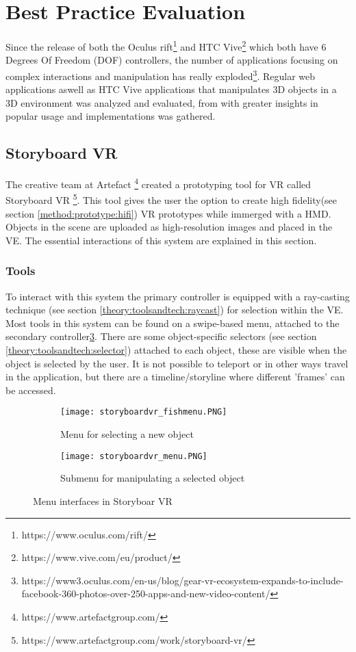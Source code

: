 \section{Best Practice Evaluation}
\label{theory:best-practice}
Since the release of both the Oculus rift\footnote{https://www.oculus.com/rift/} and HTC Vive\footnote{https://www.vive.com/eu/product/} which both have 6 Degrees Of Freedom (DOF) controllers, the number of applications focusing on complex interactions and manipulation has really exploded\footnote{https://www3.oculus.com/en-us/blog/gear-vr-ecosystem-expands-to-include-facebook-360-photos-over-250-apps-and-new-video-content/}. Regular web applications aswell as HTC Vive applications that manipulates 3D objects in a 3D environment was analyzed and evaluated, from with greater insights in popular usage and implementations was gathered.
\subsection{Storyboard VR}
The creative team at Artefact \footnote{https://www.artefactgroup.com/} created a prototyping tool for VR called Storyboard VR \footnote{https://www.artefactgroup.com/work/storyboard-vr/}. This tool gives the user the option to create high fidelity(see section \ref{method:prototype:hifi})  VR prototypes while immerged with a HMD. Objects in the scene are uploaded as high-resolution images and placed in the VE. The essential interactions of this system are explained in this section.
\subsubsection{Tools}
To interact with this system the primary controller is equipped with a ray-casting technique (see section \ref{theory:toolsandtech:raycast}) for selection within the VE.
Most tools in this system can be found on a swipe-based menu, attached to the secondary controller\ref{fig:storyboard}. There are some object-specific selectors (see section \ref{theory:toolsandtech:selector}) attached to each object, these are visible when the object is selected by the user. It is not possible to teleport or in other ways travel in the application, but there are  a timeline/storyline where different 'frames' can be accessed.

\begin{figure}
\begin{subfigure}{.5\textwidth}
  \centering
  \texttt{[image: storyboardvr\_fishmenu.PNG]}
  \caption{Menu for selecting a new object}
  \label{fig:storyboard:fishmenu}
\end{subfigure}%
\begin{subfigure}{.5\textwidth}
  \centering
  \texttt{[image: storyboardvr\_menu.PNG]}
  \caption{Submenu for manipulating a selected object}
  \label{fig:storyboard:menu}
\end{subfigure}
\caption{Menu interfaces in Storyboar VR}
\label{fig:storyboard}
\end{figure}

